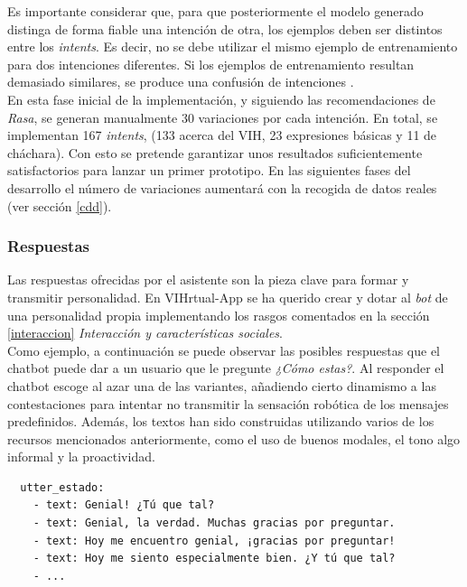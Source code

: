 Es importante considerar que, para que posteriormente el modelo generado distinga de forma fiable una intención de otra, los ejemplos deben ser distintos entre los \textit{intents}. Es decir, no se debe utilizar el mismo ejemplo de entrenamiento para dos intenciones diferentes. Si los ejemplos de entrenamiento resultan demasiado similares, se produce una confusión de intenciones \cite{bestPracticesNLU}.\\ 

En esta fase inicial de la implementación, y siguiendo las recomendaciones de \textit{Rasa}, se generan manualmente 30 variaciones por cada intención. En total, se implementan 167 \textit{intents}, (133 acerca del VIH, 23 expresiones básicas y 11 de cháchara). Con esto se pretende garantizar unos resultados suficientemente satisfactorios para lanzar un primer prototipo. En las siguientes fases del desarrollo el número de variaciones aumentará con la recogida de datos reales (ver sección \ref{cdd}).\\

\subsubsection{Respuestas}
Las respuestas ofrecidas por el asistente son la pieza clave para formar y transmitir personalidad. En VIHrtual-App se ha querido crear y dotar al \textit{bot} de una personalidad propia implementando los rasgos comentados en la sección \ref{interaccion} \textit{Interacción y características sociales}.\\

Como ejemplo, a continuación se puede observar las posibles respuestas que el chatbot puede dar a un usuario que le pregunte \textit{¿Cómo estas?}. Al responder el chatbot escoge al azar una de las variantes, añadiendo cierto dinamismo a las contestaciones para intentar no transmitir la sensación robótica de los mensajes predefinidos. Además, los textos han sido construidas utilizando varios de los recursos mencionados anteriormente, como el uso de buenos modales, el tono algo informal y la proactividad. \\

\begin{verbatim}
  utter_estado:
    - text: Genial! ¿Tú que tal?
    - text: Genial, la verdad. Muchas gracias por preguntar.
    - text: Hoy me encuentro genial, ¡gracias por preguntar!
    - text: Hoy me siento especialmente bien. ¿Y tú que tal?
    - ...
\end{verbatim}


